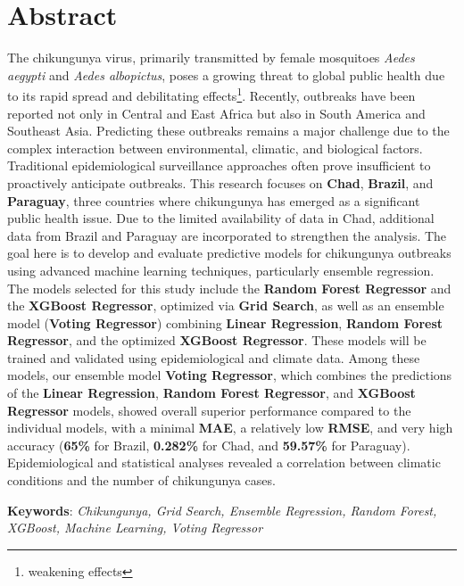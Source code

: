 \chapter*{Abstract}

\renewcommand{\abstractnamefont}{\normalfont\Large\bfseries}

\hskip7mm
%

\begin{spacing}{1.3}
	The chikungunya virus, primarily transmitted by female mosquitoes \textit{Aedes aegypti} and \textit{Aedes albopictus}, poses a growing threat to global public health due to its rapid spread and debilitating effects\footnote{weakening effects}. Recently, outbreaks have been reported not only in Central and East Africa but also in South America and Southeast Asia. Predicting these outbreaks remains a major challenge due to the complex interaction between environmental, climatic, and biological factors. Traditional epidemiological surveillance approaches often prove insufficient to proactively anticipate outbreaks. This research focuses on \textbf{Chad}, \textbf{Brazil}, and \textbf{Paraguay}, three countries where chikungunya has emerged as a significant public health issue. Due to the limited availability of data in Chad, additional data from Brazil and Paraguay are incorporated to strengthen the analysis. The goal here is to develop and evaluate predictive models for chikungunya outbreaks using advanced machine learning techniques, particularly ensemble regression. The models selected for this study include the \textbf{Random Forest Regressor} and the \textbf{XGBoost Regressor}, optimized via \textbf{Grid Search}, as well as an ensemble model (\textbf{Voting Regressor}) combining \textbf{Linear Regression}, \textbf{Random Forest Regressor}, and the optimized \textbf{XGBoost Regressor}. These models will be trained and validated using epidemiological and climate data. Among these models, our ensemble model \textbf{Voting Regressor}, which combines the predictions of the \textbf{Linear Regression}, \textbf{Random Forest Regressor}, and \textbf{XGBoost Regressor} models, showed overall superior performance compared to the individual models, with a minimal \textbf{MAE}, a relatively low \textbf{RMSE}, and very high accuracy (\textbf{65\%} for Brazil, \textbf{0.282\%} for Chad, and \textbf{59.57\%} for Paraguay). Epidemiological and statistical analyses revealed a correlation between climatic conditions and the number of chikungunya cases.
	
	\textbf{Keywords}: \textit{Chikungunya, Grid Search, Ensemble Regression, Random Forest, XGBoost, Machine Learning, Voting Regressor}
	
\end{spacing}
